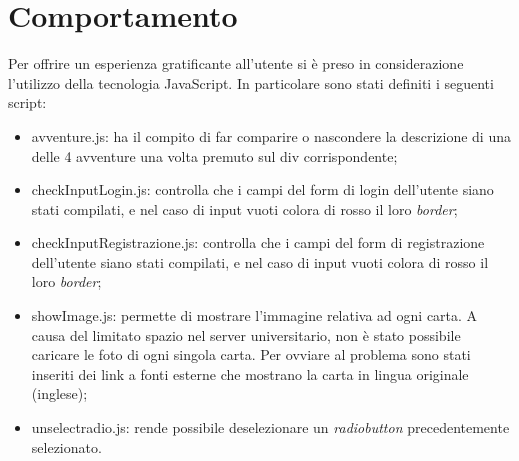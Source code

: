 \section{Comportamento}
Per offrire un esperienza gratificante all'utente si è preso in considerazione l'utilizzo della tecnologia JavaScript. In particolare sono stati definiti i seguenti script:\\
\begin{itemize}
	\item{avventure.js}: ha il compito di far comparire o nascondere la descrizione di una delle 4 avventure una volta premuto sul div corrispondente;
	\item{checkInputLogin.js}: controlla che i campi del form di login dell'utente siano stati compilati, e nel caso di input vuoti colora di rosso il loro \textit{border};
	\item{checkInputRegistrazione.js}: controlla che i campi del form di registrazione dell'utente siano stati compilati, e nel caso di input vuoti colora di rosso il loro \textit{border};
	\item{showImage.js}: permette di mostrare l'immagine relativa ad ogni carta.  A causa del limitato spazio nel server universitario, non è stato possibile caricare le foto di ogni singola carta. Per ovviare al problema sono stati inseriti dei link a fonti esterne che mostrano la carta in lingua originale (inglese);
	\item{unselectradio.js}: rende possibile deselezionare un \textit{radiobutton} precedentemente selezionato.
\end{itemize}


\newpage